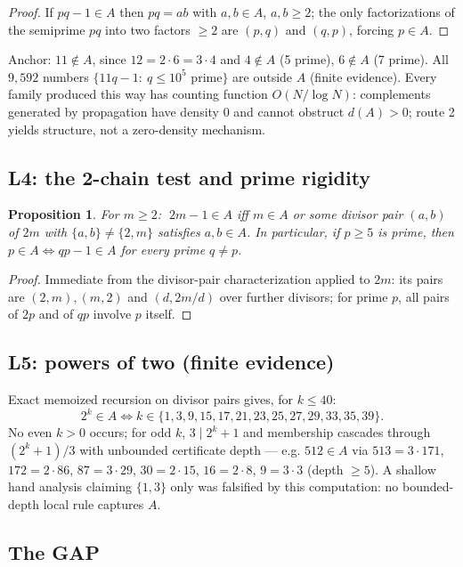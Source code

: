 \documentclass[11pt]{article}
\newtheorem{proposition}[theorem]{Proposition}
\theoremstyle{definition}
\newcommand{\A}{A}
\begin{document}
\begin{proof}
If $pq-1\in\A$ then $pq=ab$ with $a,b\in\A$, $a,b\ge2$; the only factorizations
of the semiprime $pq$ into two factors $\ge2$ are $(p,q)$ and $(q,p)$, forcing
$p\in\A$. \end{proof}

Anchor: $11\notin\A$, since $12=2\cdot6=3\cdot4$ and $4\notin\A$ (5 prime),
$6\notin\A$ (7 prime). All $9{,}592$ numbers $\{11q-1:\ q\le10^5\text{ prime}\}$
are outside $\A$ (finite evidence). Every family produced this way has
counting function $O(N/\log N)$: complements generated by propagation have
density $0$ and cannot obstruct $d(\A)>0$; route 2 yields structure, not a
zero-density mechanism.

\subsection{L4: the 2-chain test and prime rigidity}

\begin{proposition}\label{prop:L4}
For $m\ge2$: $\;2m-1\in\A$ iff $m\in\A$ or some divisor pair $(a,b)$ of $2m$
with $\{a,b\}\ne\{2,m\}$ satisfies $a,b\in\A$. In particular, if $p\ge5$ is
prime, then $p\in\A\iff qp-1\in\A$ for every prime $q\ne p$.
\end{proposition}

\begin{proof}
Immediate from the divisor-pair characterization applied to $2m$: its pairs
are $(2,m),(m,2)$ and $(d,2m/d)$ over further divisors; for prime $p$, all
pairs of $2p$ and of $qp$ involve $p$ itself.
\end{proof}

\subsection{L5: powers of two (finite evidence)}

Exact memoized recursion on divisor pairs gives, for $k\le40$:
\[
2^k\in\A \iff k\in\{1,3,9,15,17,21,23,25,27,29,33,35,39\}.
\]
No even $k>0$ occurs; for odd $k$, $3\mid 2^k+1$ and membership cascades
through $(2^k+1)/3$ with unbounded certificate depth --- e.g.
$512\in\A$ via $513=3\cdot171$, $172=2\cdot86$, $87=3\cdot29$, $30=2\cdot15$,
$16=2\cdot8$, $9=3\cdot3$ (depth $\ge5$). A shallow hand analysis claiming
$\{1,3\}$ only was falsified by this computation: no bounded-depth local rule
captures $\A$.

\subsection{The GAP}
\end{document}
